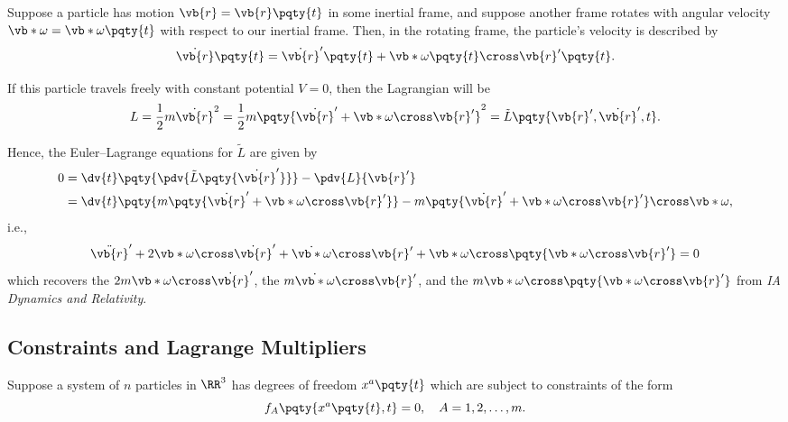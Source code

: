 \begin{example}
    Suppose a particle has motion \(\vb{r} = \vb{r}\pqty{t}\) in some inertial frame, and suppose another frame rotates with angular velocity \(\vb*{\omega} = \vb*{\omega} \pqty{t}\) with respect to our inertial frame. Then, in the rotating frame, the particle's velocity is described by 
    \begin{equation}
        \dot{\vb{r}} \pqty{t} = \dot{\vb{r}}' \pqty{t} + \vb*{\omega} \pqty{t} \cross \vb{r}' \pqty{t}.
    \end{equation}

    If this particle travels freely with constant potential \(V = 0\), then the Lagrangian will be
    \begin{equation}
        L = \frac{1}{2} m \dot{\vb{r}}^2 = \frac{1}{2} m \pqty{\dot{\vb{r}}' + \vb*{\omega} \cross \vb{r}'}^2 = \tilde{L} \pqty{\vb{r}', \dot{\vb{r}}', t}.
    \end{equation}

    Hence, the Euler--Lagrange equations for \(\tilde{L}\) are given by
    \begin{subequations}
        \begin{align}
            0 &= \dv{t} \pqty{\pdv{\tilde{L}\pqty{\dot{\vb{r}}'}}} - \pdv{L}{\vb{r}'} \\
            &= \dv{t} \pqty{m \pqty{\dot{\vb{r}}' + \vb*{\omega} \cross \vb{r}'}} - m \pqty{\dot{\vb{r}}' + \vb*{\omega} \cross \vb{r}'} \cross \vb*{\omega},
        \end{align}
    \end{subequations}
    i.e.,
    \begin{equation}
        \ddot{\vb{r}}' + 2 \vb*{\omega} \cross \dot{\vb{r}}' + \dot{\vb*{\omega}} \cross \vb{r}' + \vb*{\omega} \cross \pqty{\vb*{\omega} \cross \vb{r}'} = 0
    \end{equation}
    which recovers the  \(2 m \vb*{\omega} \cross \dot{\vb{r}}'\), the  \(m \dot{\vb*{\omega}} \cross \vb{r}'\), and the  \(m \vb*{\omega} \cross \pqty{\vb*{\omega} \cross \vb{r}'}\) from \textit{IA Dynamics and Relativity}.
\end{example}

\subsection{Constraints and Lagrange Multipliers}

Suppose a system of \(n\) particles in \(\RR^3\) has degrees of freedom \(x^a \pqty{t}\) which are subject to constraints of the form
\begin{equation}
    f_A \pqty{x^a\pqty{t}, t} = 0, \quad A = 1, 2, \ldots, m.
\end{equation}

